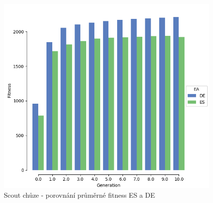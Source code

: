 	\begin{figure}[t]\centering
		\includegraphics[width=\columnwidth]{../img/WoodMap/DEvsES/WCuttorWalkMem.png}
		\caption{ Scout chůze - porovnání průměrné fitness ES a DE}
		\label{obr04:WalkESvsDE}
	\end{figure}
